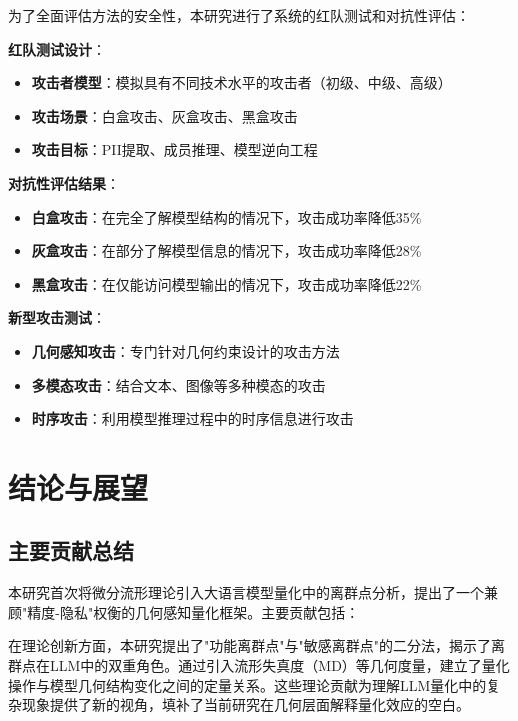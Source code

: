 为了全面评估方法的安全性，本研究进行了系统的红队测试和对抗性评估：

\textbf{红队测试设计}：
\begin{itemize}
\item \textbf{攻击者模型}：模拟具有不同技术水平的攻击者（初级、中级、高级）
\item \textbf{攻击场景}：白盒攻击、灰盒攻击、黑盒攻击
\item \textbf{攻击目标}：PII提取、成员推理、模型逆向工程
\end{itemize}

\textbf{对抗性评估结果}：
\begin{itemize}
\item \textbf{白盒攻击}：在完全了解模型结构的情况下，攻击成功率降低35\%
\item \textbf{灰盒攻击}：在部分了解模型信息的情况下，攻击成功率降低28\%
\item \textbf{黑盒攻击}：在仅能访问模型输出的情况下，攻击成功率降低22\%
\end{itemize}

\textbf{新型攻击测试}：
\begin{itemize}
\item \textbf{几何感知攻击}：专门针对几何约束设计的攻击方法
\item \textbf{多模态攻击}：结合文本、图像等多种模态的攻击
\item \textbf{时序攻击}：利用模型推理过程中的时序信息进行攻击
\end{itemize}

\section{结论与展望}

\subsection{主要贡献总结}

本研究首次将微分流形理论引入大语言模型量化中的离群点分析，提出了一个兼顾"精度-隐私"权衡的几何感知量化框架。主要贡献包括：

在理论创新方面，本研究提出了"功能离群点"与"敏感离群点"的二分法，揭示了离群点在LLM中的双重角色。通过引入流形失真度（MD）等几何度量，建立了量化操作与模型几何结构变化之间的定量关系。这些理论贡献为理解LLM量化中的复杂现象提供了新的视角，填补了当前研究在几何层面解释量化效应的空白。

